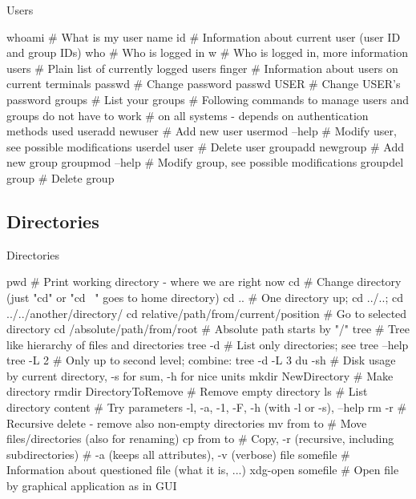 \documentclass[compress, ucs, xelatex, 11pt, xcolor=svgnames,
  hyperref={
    bookmarks=true,
    unicode=true,
    colorlinks=true,
    pdftitle={Linux, command line and MetaCentrum},
    plainpages=false,
    pdfauthor={Vojtech Zeisek},
    pdfsubject={Course about use of Linux command line, writing shell scripts and using MetaCentrum of CESNET},
    pdfcreator={XeLaTeX},
    pdfkeywords={Linux, GNU, BASH, shell, command line, MetaCentrum},
    linkcolor=Red,
    anchorcolor=Blue,
    citecolor=Purple,
    filecolor=DodgerBlue,
    menucolor=DarkOrchid,
    urlcolor=DeepSkyBlue,
    pdftex},
  url={hyphens, lowtilde} %
  ]{beamer}
\begin{document}
\begin{frame}[fragile]{Users}
  \begin{bashcode}
    whoami # What is my user name
    id # Information about current user (user ID and group IDs)
    who # Who is logged in
    w # Who is logged in, more information
    users # Plain list of currently logged users
    finger # Information about users on current terminals
    passwd # Change password
    passwd USER # Change USER's password
    groups # List your groups
    # Following commands to manage users and groups do not have to work
    # on all systems - depends on authentication methods used
    useradd newuser # Add new user
    usermod --help # Modify user, see possible modifications
    userdel user # Delete user
    groupadd newgroup # Add new group
    groupmod --help # Modify group, see possible modifications
    groupdel group # Delete group
  \end{bashcode}
\end{frame}

\subsection{Directories}

\begin{frame}[fragile]{Directories}
  \begin{bashcode}
    pwd # Print working directory - where we are right now
    cd # Change directory (just "cd" or "cd ~" goes to home directory)
    cd .. # One directory up; cd ../..; cd ../../another/directory/
    cd relative/path/from/current/position # Go to selected directory
    cd /absolute/path/from/root # Absolute path starts by "/"
    tree # Tree like hierarchy of files and directories
    tree -d # List only directories; see tree --help
    tree -L 2 # Only up to second level; combine: tree -d -L 3
    du -sh # Disk usage by current directory, -s for sum, -h for nice units
    mkdir NewDirectory # Make directory
    rmdir DirectoryToRemove # Remove empty directory
    ls # List directory content
       # Try parameters -l, -a, -1, -F, -h (with -l or -s), --help
    rm -r # Recursive delete - remove also non-empty directories
    mv from to # Move files/directories (also for renaming)
    cp from to # Copy, -r (recursive, including subdirectories)
               # -a (keeps all attributes), -v (verbose)
    file somefile # Information about questioned file (what it is, ...)
    xdg-open somefile # Open file by graphical application as in GUI
  \end{bashcode}
\end{frame}
\end{document}

